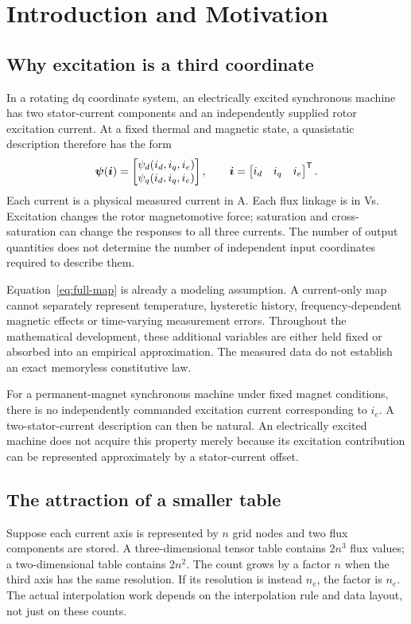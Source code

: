 \chapter{Introduction and Motivation}\label{ch:introduction}

\section{Why excitation is a third coordinate}
In a rotating dq coordinate system, an electrically excited synchronous machine has two stator-current components and an independently supplied rotor excitation current. At a fixed thermal and magnetic state, a quasistatic description therefore has the form
\begin{equation}\label{eq:full-map}
\bm\psi(\bm i)=
\begin{bmatrix}\psi_d(i_d,i_q,i_e)\\\psi_q(i_d,i_q,i_e)\end{bmatrix},
\qquad
\bm i=\begin{bmatrix}i_d&i_q&i_e\end{bmatrix}^{\mathsf T}.
\end{equation}
Each current is a physical measured current in A. Each flux linkage is in Vs. Excitation changes the rotor magnetomotive force; saturation and cross-saturation can change the responses to all three currents. The number of output quantities does not determine the number of independent input coordinates required to describe them.

Equation~\eqref{eq:full-map} is already a modeling assumption. A current-only map cannot separately represent temperature, hysteretic history, frequency-dependent magnetic effects or time-varying measurement errors. Throughout the mathematical development, these additional variables are either held fixed or absorbed into an empirical approximation. The measured data do not establish an exact memoryless constitutive law.

For a permanent-magnet synchronous machine under fixed magnet conditions, there is no independently commanded excitation current corresponding to $i_e$. A two-stator-current description can then be natural. An electrically excited machine does not acquire this property merely because its excitation contribution can be represented approximately by a stator-current offset.

\section{The attraction of a smaller table}
Suppose each current axis is represented by $n$ grid nodes and two flux components are stored. A three-dimensional tensor table contains $2n^3$ flux values; a two-dimensional table contains $2n^2$. The count grows by a factor $n$ when the third axis has the same resolution. If its resolution is instead $n_e$, the factor is $n_e$. The actual interpolation work depends on the interpolation rule and data layout, not just on these counts.

